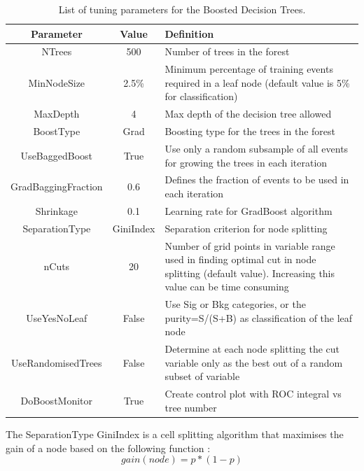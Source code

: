 \documentclass{cernatlasnote}
\begin{document}
\FloatBarrier

\begin{table}[h]
\begin{center}
\begin{tabular}{ |c|c|m{8cm}| } 
    \hline
    \rowcolor{lightgray} 
    Parameter & Value & Definition\\
    \hline
    NTrees & 500 & Number of trees in the forest  \\ 
    \hline
    MinNodeSize & 2.5\% & Minimum percentage of training
events required in a leaf node (default value is 5\% for classification) \\
    \hline
    MaxDepth & 4 & Max depth of the decision tree allowed \\ 
    \hline
    BoostType & Grad & Boosting type for the trees in the forest  \\ 
    \hline
    UseBaggedBoost & True & Use only a random subsample of all
    events for growing the trees in each iteration \\
    \hline
    GradBaggingFraction & 0.6 & Defines the fraction of
events to be used in each iteration \\
    \hline
    Shrinkage & 0.1 & Learning rate for GradBoost algorithm \\
    \hline
    SeparationType & GiniIndex & Separation criterion for node splitting \\
    \hline
    nCuts & 20 & Number of grid points in variable
range used in finding optimal cut in
node splitting (default value). Increasing this value can be time consuming\\
    \hline
    UseYesNoLeaf & False & Use Sig or Bkg categories, or the purity=S/(S+B) as classification of the
leaf node \\
    \hline
    UseRandomisedTrees & False & Determine at each node splitting the
cut variable only as the best out of
a random subset of variable \\
    \hline
    DoBoostMonitor & True & Create control plot with ROC integral
vs tree number \\
    \hline
\end{tabular}
\end{center}
\caption{List of tuning parameters for the Boosted Decision Trees.}
\label{TAB : BDTPARA}
\end{table}
The SeparationType GiniIndex is a cell splitting algorithm that maximises the gain of a node based on the following function :
\begin{equation}
    gain(node) = p*(1-p)
\end{equation}
\end{document}
